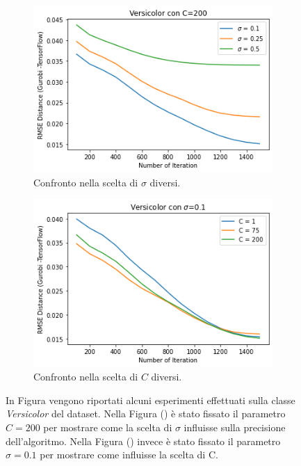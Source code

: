 \documentclass[a4paper,12pt]{report}
\begin{document}
\begin{figure}[H]
    \begin{subfigure}{0.47\textwidth}
        \centering
        \includegraphics[scale=0.5]{images/Grafici/Versicolor_C200_sigmaDiversi.png}
        \caption{Confronto nella scelta di $\sigma$ diversi.}
        \label{subfig:Versicolor_C200_sigmaDiversi}
    \end{subfigure}
    \begin{subfigure}{0.47\textwidth}
        \centering
        \includegraphics[scale=0.5]{images/Grafici/Versicolor_Cdiversi_sigma01.png}
        \caption{Confronto nella scelta di $C$ diversi.}
        \label{subfig:Versicolor_Cdiversi_sigma01}
    \end{subfigure}
    \caption{In Figura vengono riportati alcuni esperimenti effettuati sulla classe \textit{Versicolor} del dataset. Nella Figura () è stato fissato il parametro $C=200$ per mostrare come la scelta di $\sigma$ influisse sulla precisione dell'algoritmo. Nella Figura () invece è stato fissato il parametro $\sigma = 0.1$ per mostrare come influisse la scelta di C.}
    \label{fig:Versicolor_Preliminari}
\end{figure}
\end{document}

